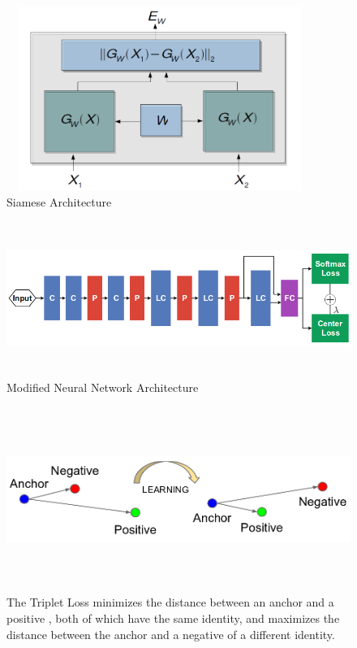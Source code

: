 \documentclass[a4paper,12pt, twoside]{NITKReport}
\begin{document}
\begin{figure} [h]
\centering
    \includegraphics[height=6cm,width=10cm]{siamese.png}
    \caption{Siamese Architecture}
    \label{siamese}
\end{figure}
\begin{figure} [h]
\centering
    \includegraphics[height=5cm,width=15cm]{center.png}
    \caption{Modified Neural Network Architecture}
    \label{center}
\end{figure}
\begin{figure}[h]
\centering
    \includegraphics[height=6cm,width=13cm]{Selection_034.png}
    \caption{The Triplet Loss minimizes the distance between an anchor and a positive , both of which have the same identity, and maximizes the distance between the anchor and a negative of a different identity.}
    \label{triplet}
 
\end{figure}
\end{document}
